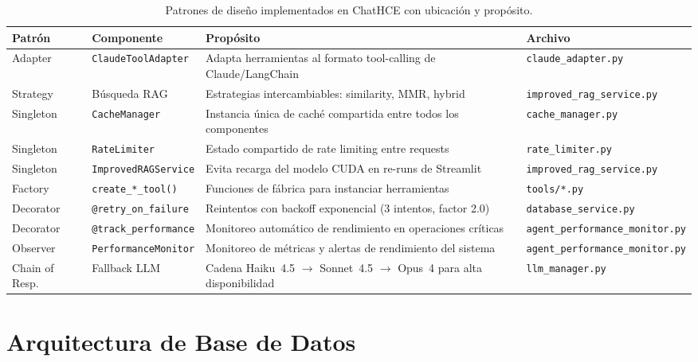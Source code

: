 ﻿\documentclass[11pt,a4paper]{article}
\begin{document}
\begin{table}[H]
\centering
\caption{Patrones de dise\~no implementados en ChatHCE con ubicaci\'on y prop\'osito.}
\label{tab:patrones}
\begin{tabularx}{\textwidth}{llXl}
\toprule
\textbf{Patr\'on} & \textbf{Componente} & \textbf{Prop\'osito} & \textbf{Archivo} \\
\midrule
Adapter & \texttt{ClaudeToolAdapter} & Adapta herramientas al formato tool-calling de Claude/LangChain & \texttt{claude\_adapter.py} \\
\addlinespace
Strategy & B\'usqueda RAG & Estrategias intercambiables: similarity, MMR, hybrid & \texttt{improved\_rag\_service.py} \\
\addlinespace
Singleton & \texttt{CacheManager} & Instancia \'unica de cach\'e compartida entre todos los componentes & \texttt{cache\_manager.py} \\
\addlinespace
Singleton & \texttt{RateLimiter} & Estado compartido de rate limiting entre requests & \texttt{rate\_limiter.py} \\
\addlinespace
Singleton & \texttt{ImprovedRAGService} & Evita recarga del modelo CUDA en re-runs de Streamlit & \texttt{improved\_rag\_service.py} \\
\addlinespace
Factory & \texttt{create\_*\_tool()} & Funciones de f\'abrica para instanciar herramientas & \texttt{tools/*.py} \\
\addlinespace
Decorator & \texttt{@retry\_on\_failure} & Reintentos con backoff exponencial (3 intentos, factor 2.0) & \texttt{database\_service.py} \\
\addlinespace
Decorator & \texttt{@track\_performance} & Monitoreo autom\'atico de rendimiento en operaciones cr\'iticas & \texttt{agent\_performance\_monitor.py} \\
\addlinespace
Observer & \texttt{PerformanceMonitor} & Monitoreo de m\'etricas y alertas de rendimiento del sistema & \texttt{agent\_performance\_monitor.py} \\
\addlinespace
Chain of Resp. & Fallback LLM & Cadena Haiku~4.5 $\to$ Sonnet~4.5 $\to$ Opus~4 para alta disponibilidad & \texttt{llm\_manager.py} \\
\bottomrule
\end{tabularx}
\end{table}

\section{Arquitectura de Base de Datos}
\end{document}

